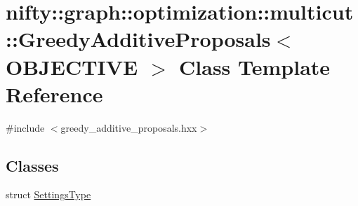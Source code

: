 \hypertarget{classnifty_1_1graph_1_1optimization_1_1multicut_1_1GreedyAdditiveProposals}{}\section{nifty\+:\+:graph\+:\+:optimization\+:\+:multicut\+:\+:Greedy\+Additive\+Proposals$<$ O\+B\+J\+E\+C\+T\+I\+V\+E $>$ Class Template Reference}
\label{classnifty_1_1graph_1_1optimization_1_1multicut_1_1GreedyAdditiveProposals}


{\ttfamily \#include $<$greedy\+\_\+additive\+\_\+proposals.\+hxx$>$}

\subsection*{Classes}
\begin{DoxyCompactItemize}
\item 
struct \hyperlink{structnifty_1_1graph_1_1optimization_1_1multicut_1_1GreedyAdditiveProposals_1_1SettingsType}{Settings\+Type}
\end{DoxyCompactItemize}
